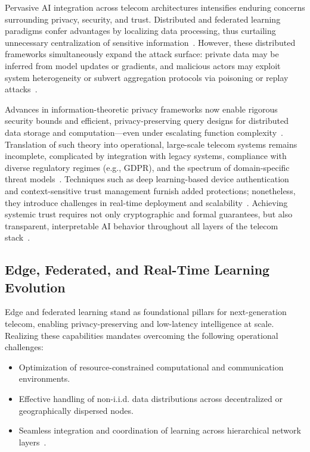 \documentclass[sigconf]{acmart}
\begin{document}
Pervasive AI integration across telecom architectures intensifies enduring concerns surrounding privacy, security, and trust. Distributed and federated learning paradigms confer advantages by localizing data processing, thus curtailing unnecessary centralization of sensitive information~\cite{ref17,ref18,ref19,ref23,ref24,ref26,ref48}. However, these distributed frameworks simultaneously expand the attack surface: private data may be inferred from model updates or gradients, and malicious actors may exploit system heterogeneity or subvert aggregation protocols via poisoning or replay attacks~\cite{ref10,ref20,ref21,ref23}.

Advances in information-theoretic privacy frameworks now enable rigorous security bounds and efficient, privacy-preserving query designs for distributed data storage and computation—even under escalating function complexity~\cite{ref48}. Translation of such theory into operational, large-scale telecom systems remains incomplete, complicated by integration with legacy systems, compliance with diverse regulatory regimes (e.g., GDPR), and the spectrum of domain-specific threat models~\cite{ref10,ref24,ref49}. Techniques such as deep learning-based device authentication and context-sensitive trust management furnish added protections; nonetheless, they introduce challenges in real-time deployment and scalability~\cite{ref18,ref23}. Achieving systemic trust requires not only cryptographic and formal guarantees, but also transparent, interpretable AI behavior throughout all layers of the telecom stack~\cite{ref19,ref26,ref49}.

\subsection{Edge, Federated, and Real-Time Learning Evolution}

Edge and federated learning stand as foundational pillars for next-generation telecom, enabling privacy-preserving and low-latency intelligence at scale. Realizing these capabilities mandates overcoming the following operational challenges:
\begin{itemize}
    \item Optimization of resource-constrained computational and communication environments.
    \item Effective handling of non-i.i.d. data distributions across decentralized or geographically dispersed nodes.
    \item Seamless integration and coordination of learning across hierarchical network layers~\cite{ref17,ref19,ref23,ref25,ref26,ref39,ref42,ref48}.
\end{itemize}
\end{document}
